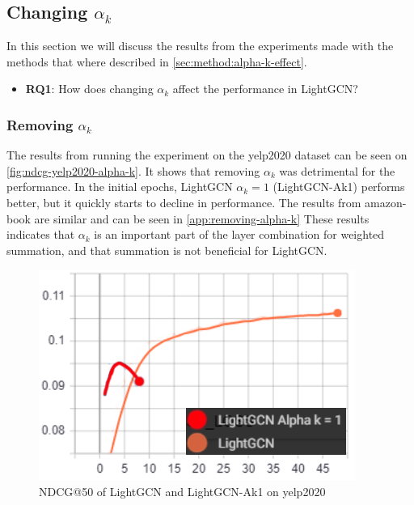 \subsection{Changing $\alpha_k$}
In this section we will discuss the results from the experiments made with the methods that where described in \autoref{sec:method:alpha-k-effect}.
\begin{itemize}
    \item \textbf{RQ1}: How does changing $\alpha_k$ affect the performance in LightGCN?
\end{itemize}

\subsubsection{Removing $\alpha_k$}\label{subsubsec:remove-alpha-k}
The results from running the experiment on the yelp2020 dataset can be seen on \autoref{fig:ndcg-yelp2020-alpha-k}.
It shows that removing $\alpha_k$ was detrimental for the performance.
In the initial epochs, LightGCN $\alpha_k = 1$ (LightGCN-Ak1) performs better, but it quickly starts to decline in performance.
The results from amazon-book are similar and can be seen in \autoref{app:removing-alpha-k}
These results indicates that $\alpha_k$ is an important part of the layer combination for weighted summation, and that summation is not beneficial for LightGCN.
\begin{figure}
    \includegraphics[width=\linewidth]{figures/alpha-k-results/yelp2020-ndcg.png}
    \caption{NDCG@50 of LightGCN and LightGCN-Ak1 on yelp2020}
    \label{fig:ndcg-yelp2020-alpha-k}
\end{figure}

